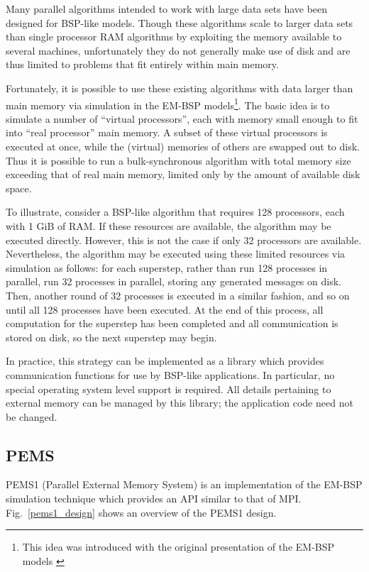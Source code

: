 \documentclass[12pt]{carletoncsthesis}
\begin{document}
Many parallel algorithms intended to work with large data sets have been
designed for BSP-like models.  Though these algorithms scale to larger data
sets than single processor RAM algorithms by exploiting the memory available
to several machines, unfortunately they do not generally make use of disk
and are thus limited to problems that fit entirely within main memory.

Fortunately, it is possible to use these existing algorithms with data larger
than main memory via simulation in the EM-BSP models\footnote{This idea was
introduced with the original presentation of the EM-BSP models
\cite{dhthesis}\cite{bspem}\cite{emsimulation}}.
The basic idea is to simulate a number of ``virtual processors'', each with
memory small enough to fit into ``real processor'' main memory.  A subset of
these virtual processors is executed at once, while the (virtual) memories of
others are swapped out to disk.  Thus it is possible to run a bulk-synchronous
algorithm with total memory size exceeding that of real main memory, limited
only by the amount of available disk space.

To illustrate, consider a BSP-like algorithm that requires 128 processors,
each with 1 GiB of RAM.  If these resources are available, the algorithm may
be executed directly.  However, this is not the case if only 32 processors are
available.  Nevertheless, the algorithm may be executed using these limited
resources via simulation as follows: for each superstep, rather than run 128
processes in parallel, run 32 processes in parallel, storing any generated
messages on disk.  Then, another round of 32 processes is executed in a similar
fashion, and so on until all 128 processes have been executed.  At the end
of this process, all computation for the superstep has been completed and
all communication is stored on disk, so the next superstep may begin.

In practice, this strategy can be implemented as a library which provides
communication functions for use by BSP-like applications.  In particular, no
special operating system level support is required.  All details pertaining
to external memory can be managed by this library; the application code
need not be changed.

\subsection{PEMS}


PEMS1 \cite{mnthesis} (Parallel External Memory System) is an implementation of
the EM-BSP simulation technique which provides an API similar to that of MPI.
Fig.~\ref{pems1_design} shows an overview of the PEMS1 design.
\end{document}
